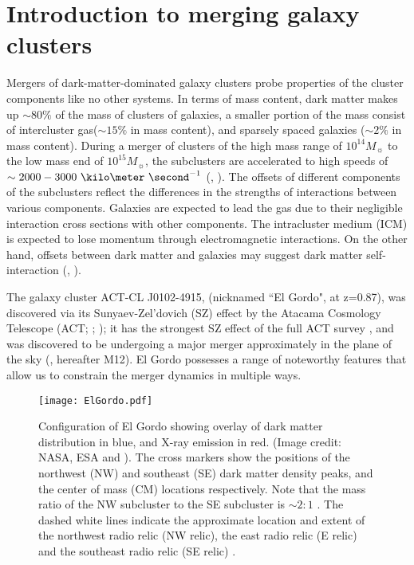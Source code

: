 \documentclass[ucdthesis.tex]{subfiles}
\begin{document}
    \section{Introduction to merging galaxy clusters} 
    Mergers of dark-matter-dominated galaxy clusters probe properties
    of the cluster components like no other systems. 
    In terms of mass content, dark matter makes up $\sim80\%$ of the mass of clusters
    of galaxies, a smaller portion of the mass consist of intercluster
    gas($\sim15\%$ in mass content), and sparsely spaced galaxies ($\sim2\%$ in mass content). During a merger of
    clusters of the high mass range of $10^{14} M_{\sun}$ to the low mass end of
    $10^{15} M_{\sun}$, the subclusters are accelerated to high speeds of 
    $\sim 2000 - 3000~\kilo \meter~\second^{-1}$ (\citealt{Lage2014},
    \citealt{Dawson12}). The offsets of
    different components of the subclusters reflect the differences in the
    strengths of interactions between various components. Galaxies are
    expected to lead the gas due to their negligible interaction cross
    sections with other components. The intracluster medium (ICM) is expected to lose
    momentum through electromagnetic interactions. On the other hand, offsets
    between dark matter and galaxies may suggest dark matter self-interaction
    (\citealt{Kahlhoefer14}, \citealt{Randall2008d}).  
    \par
    The galaxy cluster ACT-CL J0102-4915, (nicknamed ``El Gordo", at z=0.87),
    was discovered via its Sunyaev-Zel'dovich (SZ) effect by the Atacama Cosmology Telescope (ACT;
    \citealt{Menanteau2010}; \citealt{Marriage11}); it has the strongest SZ
    effect of the full ACT survey \citep{Hasselfield2013}, and was discovered
    to be undergoing a major merger approximately in the plane of the sky
    (\citealt{M12}, hereafter M12). El Gordo possesses a range of noteworthy features that allow us to constrain the merger dynamics in multiple ways. 
    \begin{figure*}
    	\texttt{[image: ElGordo.pdf]}
    	\caption{Configuration of El Gordo showing overlay of dark
    		matter distribution in blue, and X-ray emission in red. 
    		(Image credit: NASA, ESA and \citealt{Jee13}). 
    		The cross markers show the positions of the northwest (NW) and
    		southeast (SE) dark matter density peaks, and the center of mass (CM)
    		locations respectively. Note that the mass ratio of the NW subcluster
    		to the SE subcluster is $\sim 2:1$ \citep{Jee13}. 
    		The dashed white lines indicate the approximate location and extent of the northwest radio relic (NW relic), the east radio relic (E relic) and the
    		southeast radio relic (SE relic) \citep{L13}.
    		\label{fig:config}
    	}
    \end{figure*}
\end{document}
